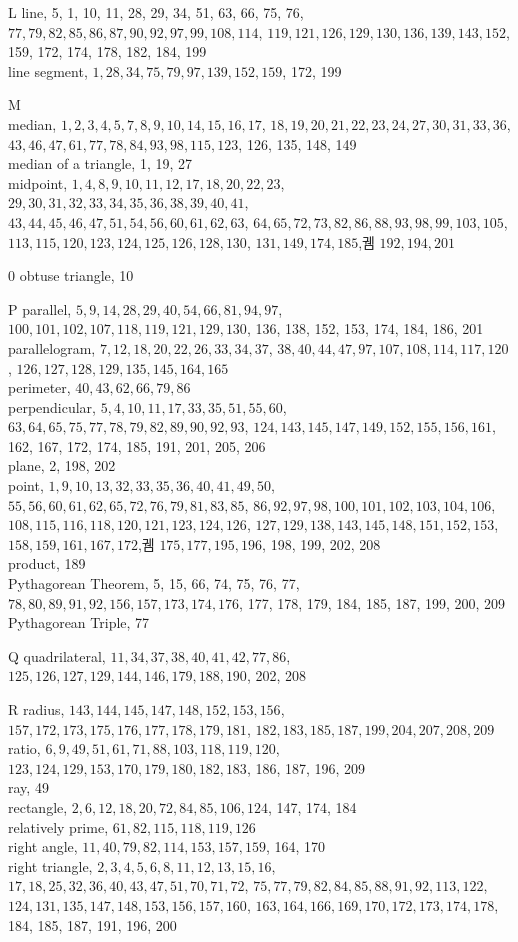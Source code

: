 \documentclass[10pt]{article}
\begin{document}
L
line, 5, 1, 10, 11, 28, 29, 34, 51, 63, 66, 75, 76, \(77,79,82,85,86,87,90,92,97,99,108,114\), \(119,121,126,129,130,136,139,143,152\), 159, 172, 174, 178, 182, 184, 199\\
line segment, \(1,28,34,75,79,97,139,152,159\), 172, 199

M\\
median, \(1,2,3,4,5,7,8,9,10,14,15,16,17\), \(18,19,20,21,22,23,24,27,30,31,33,36\), \(43,46,47,61,77,78,84,93,98,115,123\), 126, 135, 148, 149\\
median of a triangle, 1, 19, 27\\
midpoint, \(1,4,8,9,10,11,12,17,18,20,22,23\), \(29,30,31,32,33,34,35,36,38,39,40,41\),\\
\(43,44,45,46,47,51,54,56,60,61,62,63\), \(64,65,72,73,82,86,88,93,98,99,103,105\), \(113,115,120,123,124,125,126,128,130\), \(131,149,174,185\),궴 \(192,194,201\)

0
obtuse triangle, 10

P
parallel, \(5,9,14,28,29,40,54,66,81,94,97\), \(100,101,102,107,118,119,121,129,130\), 136, 138, 152, 153, 174, 184, 186, 201\\
parallelogram, \(7,12,18,20,22,26,33,34,37\), \(38,40,44,47,97,107,108,114,117,120\), \(126,127,128,129,135,145,164,165\)\\
perimeter, \(40,43,62,66,79,86\)\\
perpendicular, \(5,4,10,11,17,33,35,51,55,60\), \(63,64,65,75,77,78,79,82,89,90,92,93\), \(124,143,145,147,149,152,155,156,161\), 162, 167, 172, 174, 185, 191, 201, 205, 206\\
plane, 2, 198, 202\\
point, \(1,9,10,13,32,33,35,36,40,41,49,50\), \(55,56,60,61,62,65,72,76,79,81,83,85\), \(86,92,97,98,100,101,102,103,104,106\), \(108,115,116,118,120,121,123,124,126\), \(127,129,138,143,145,148,151,152,153\), \(158,159,161,167,172\),궴 \(175,177,195,196\), 198, 199, 202, 208\\
product, 189\\
Pythagorean Theorem, 5, 15, 66, 74, 75, 76, 77, \(78,80,89,91,92,156,157,173,174,176\), 177, 178, 179, 184, 185, 187, 199, 200, 209\\
Pythagorean Triple, 77

Q
quadrilateral, \(11,34,37,38,40,41,42,77,86\), \(125,126,127,129,144,146,179,188,190\), 202, 208

R
radius, \(143,144,145,147,148,152,153,156\), \(157,172,173,175,176,177,178,179,181\), \(182,183,185,187,199,204,207,208,209\)\\
ratio, \(6,9,49,51,61,71,88,103,118,119,120\), \(123,124,129,153,170,179,180,182,183\), 186, 187, 196, 209\\
ray, 49\\
rectangle, \(2,6,12,18,20,72,84,85,106,124\), 147, 174, 184\\
relatively prime, \(61,82,115,118,119,126\)\\
right angle, \(11,40,79,82,114,153,157,159\), 164, 170\\
right triangle, \(2,3,4,5,6,8,11,12,13,15,16\), \(17,18,25,32,36,40,43,47,51,70,71,72\), \(75,77,79,82,84,85,88,91,92,113,122\), \(124,131,135,147,148,153,156,157,160\), \(163,164,166,169,170,172,173,174,178\), 184, 185, 187, 191, 196, 200
\end{document}
